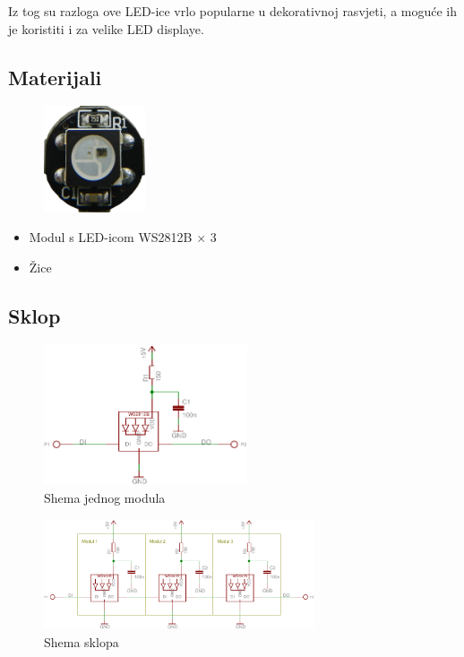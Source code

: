 \documentclass[times, utf8, zavrsni, numeric, sort]{fer}
\begin{document}
Iz tog su razloga ove LED-ice vrlo popularne u dekorativnoj rasvjeti, a moguće ih je koristiti i za velike LED displaye.

\subsection{Materijali}

\begin{figure}[h!]
	\centering
	\includegraphics[width=3cm]{./Fotke/WS2812B/Materijal.jpg}
	\label{fig:slika1}
\end{figure}

\begin{itemize}
	\setlength{\itemsep}{0pt}
	\setlength{\parskip}{0pt}
	
	\item Modul s LED-icom WS2812B $\times$ 3
	\item Žice
\end{itemize}

\subsection{Sklop}

\begin{figure}[htb]
	\centering
	\includegraphics[width=6cm]{./Sklopovi/WS2812B/WS2812B-module.pdf}
	\caption{Shema jednog modula}
	\label{fig:ws2812b-module}
\end{figure}

\begin{figure}[htb]
	\centering
	\includegraphics[width=8cm]{./Sklopovi/WS2812B/WS2812B-strip.pdf}
	\caption{Shema sklopa}
	\label{fig:ws2812b-strip}
\end{figure}
\end{document}
